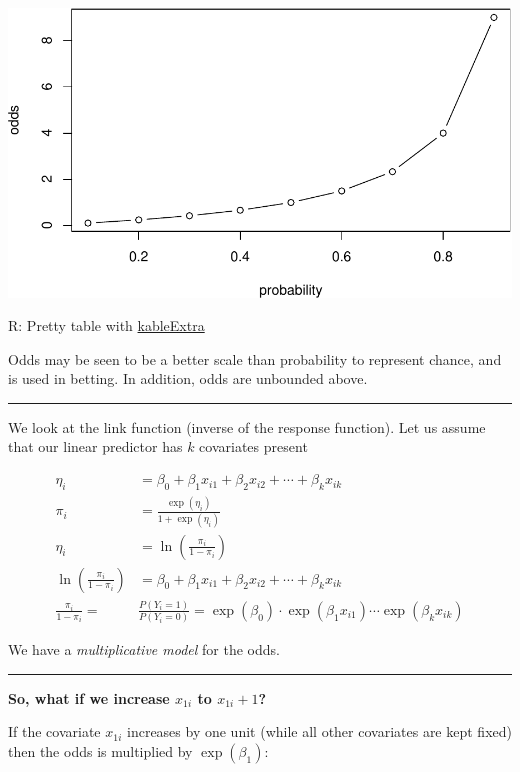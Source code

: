 \documentclass[
]{article}
\begin{document}
\includegraphics{3BinReg_files/figure-latex/unnamed-chunk-8-1.pdf}

R: Pretty table with
\href{https://cran.r-project.org/web/packages/kableExtra/vignettes/awesome_table_in_html.html}{kableExtra}

Odds may be seen to be a better scale than probability to represent
chance, and is used in betting. In addition, odds are unbounded above.

\begin{center}\rule{0.5\linewidth}{0.5pt}\end{center}

We look at the link function (inverse of the response function). Let us
assume that our linear predictor has \(k\) covariates present

\begin{align*}
\eta_i&= \beta_0+\beta_1 x_{i1}+\beta_2 x_{i2}+\cdots + \beta_k x_{ik}\\
\pi_i&= \frac{\exp(\eta_i)}{1+\exp(\eta_i)}\\
\eta_i&=\ln(\frac{\pi_i}{1-\pi_i})\\
\ln(\frac{\pi_i}{1-\pi_i})&=\beta_0+\beta_1 x_{i1}+\beta_2 x_{i2}+\cdots + \beta_k x_{ik}\\
\frac{\pi_i}{1-\pi_i}=&\frac{P(Y_i=1)}{P(Y_i=0)}=\exp(\beta_0)\cdot \exp(\beta_1 x_{i1})\cdots\exp(\beta_k x_{ik})
\end{align*}

We have a \emph{multiplicative model} for the odds.

\begin{center}\rule{0.5\linewidth}{0.5pt}\end{center}

\textbf{So, what if we increase \(x_{1i}\) to \(x_{1i}+1\)?}

If the covariate \(x_{1i}\) increases by one unit (while all other
covariates are kept fixed) then the odds is multiplied by
\(\exp(\beta_1)\):
\end{document}
